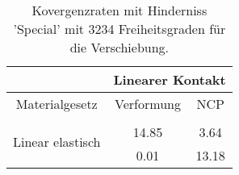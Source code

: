 \begin{table} 
\centering 
\begin{tabular}{c|cc|} 
\cline{2-3} 
 & \multicolumn{2}{|c|}{Linearer Kontakt} \\ 
\hline 
\multicolumn{1}{|c|}{Materialgesetz} & \multicolumn{1}{c|}{Verformung} & \multicolumn{1}{c|}{NCP} \\ 
\hline 
\multicolumn{1}{|c|}{\multirow{3}{*}{Linear elastisch}} &\multicolumn{1}{|c|}{} & \multicolumn{1}{|c|}{} \\ 
\multicolumn{1}{|c|}{} & \multicolumn{1}{|c|}{     14.85} & \multicolumn{1}{|c|}{      3.64} \\ 
\multicolumn{1}{|c|}{} & \multicolumn{1}{|c|}{      0.01} & \multicolumn{1}{|c|}{     13.18} \\ 
\hline 
\end{tabular}\caption{Kovergenzraten mit Hinderniss 'Special' mit 3234 Freiheitsgraden für die Verschiebung.}\label{tab:Rate_Special_level4}
\end{table} 

